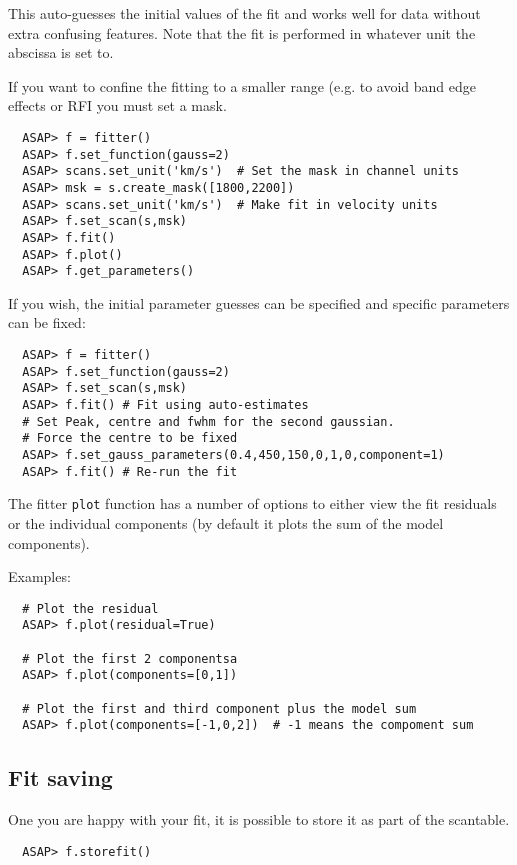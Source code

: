 \documentclass[11pt]{article}
\newcommand{\cmd}[1]{{\tt #1}}
\begin{document}
This auto-guesses the initial values of the fit and works well for data
without extra confusing features. Note that the fit is performed in
whatever unit the abscissa is set to.

If you want to confine the fitting to a smaller range (e.g. to avoid
band edge effects or RFI you must set a mask.

\begin{verbatim}
  ASAP> f = fitter()
  ASAP> f.set_function(gauss=2)
  ASAP> scans.set_unit('km/s')  # Set the mask in channel units
  ASAP> msk = s.create_mask([1800,2200])
  ASAP> scans.set_unit('km/s')  # Make fit in velocity units
  ASAP> f.set_scan(s,msk)
  ASAP> f.fit()
  ASAP> f.plot()
  ASAP> f.get_parameters()
\end{verbatim}

If you wish, the initial parameter guesses can be specified and
specific parameters can be fixed:

\begin{verbatim}
  ASAP> f = fitter()
  ASAP> f.set_function(gauss=2)
  ASAP> f.set_scan(s,msk)
  ASAP> f.fit() # Fit using auto-estimates
  # Set Peak, centre and fwhm for the second gaussian.
  # Force the centre to be fixed
  ASAP> f.set_gauss_parameters(0.4,450,150,0,1,0,component=1)
  ASAP> f.fit() # Re-run the fit
\end{verbatim}

The fitter \cmd{plot} function has a number of options to either view
the fit residuals or the individual components (by default it plots
the sum of the model components).

Examples:

\begin{verbatim}
  # Plot the residual
  ASAP> f.plot(residual=True)

  # Plot the first 2 componentsa
  ASAP> f.plot(components=[0,1])

  # Plot the first and third component plus the model sum
  ASAP> f.plot(components=[-1,0,2])  # -1 means the compoment sum
\end{verbatim}

\subsection{Fit saving}

One you are happy with your fit, it is
possible to store it as part of the scantable.

\begin{verbatim}
  ASAP> f.storefit()
\end{verbatim}
\end{document}
